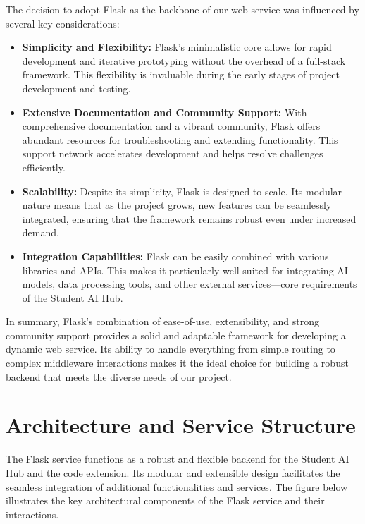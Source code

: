 The decision to adopt Flask as the backbone of our web service was influenced by several key considerations:
\begin{itemize}
    \item \textbf{Simplicity and Flexibility:} Flask’s minimalistic core allows for rapid development and iterative prototyping without the overhead of a full-stack framework. This flexibility is invaluable during the early stages of project development and testing.
    \item \textbf{Extensive Documentation and Community Support:} With comprehensive documentation and a vibrant community, Flask offers abundant resources for troubleshooting and extending functionality. This support network accelerates development and helps resolve challenges efficiently.
    \item \textbf{Scalability:} Despite its simplicity, Flask is designed to scale. Its modular nature means that as the project grows, new features can be seamlessly integrated, ensuring that the framework remains robust even under increased demand.
    \item \textbf{Integration Capabilities:} Flask can be easily combined with various libraries and APIs. This makes it particularly well-suited for integrating AI models, data processing tools, and other external services—core requirements of the Student AI Hub.
\end{itemize}

In summary, Flask’s combination of ease-of-use, extensibility, and strong community support provides a solid and adaptable framework for developing a dynamic web service. Its ability to handle everything from simple routing to complex middleware interactions makes it the ideal choice for building a robust backend that meets the diverse needs of our project.

\section{Architecture and Service Structure}

The Flask service functions as a robust and flexible backend for the Student AI Hub and the code extension. Its modular and extensible design facilitates the seamless integration of additional functionalities and services. The figure below illustrates the key architectural components of the Flask service and their interactions.

